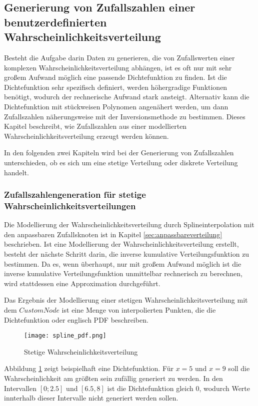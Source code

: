 \subsection{Generierung von Zufallszahlen einer benutzerdefinierten Wahrscheinlichkeitsverteilung}
\label{sec:anpassbareverteilungberechnung}

Besteht die Aufgabe darin Daten zu generieren, die von Zufallswerten einer komplexen Wahrscheinlichkeitsverteilung abhängen, ist es oft nur mit sehr großem Aufwand möglich eine passende Dichtefunktion zu finden. Ist die Dichtefunktion sehr spezifisch definiert, werden höhergradige Funktionen benötigt, wodurch der rechnerische Aufwand stark ansteigt. Alternativ kann die Dichtefunktion mit stückweisen Polynomen angenähert werden, um dann Zufallszahlen näherungsweise mit der Inversionsmethode zu bestimmen. Dieses Kapitel beschreibt, wie Zufallszahlen aus einer modellierten Wahrscheinlichkeitsverteilung erzeugt werden können.

In den folgenden zwei Kapiteln wird bei der Generierung von Zufallszahlen unterschieden, ob es sich um eine stetige Verteilung oder diskrete Verteilung handelt.

\subsubsection{Zufallszahlengeneration für stetige Wahrscheinlichkeitsverteilungen}

Die Modellierung der Wahrscheinlichkeitsverteilung durch Splineinterpolation mit den anpassbaren Zufallsknoten ist in Kapitel \ref{sec:anpassbareverteilung} beschrieben. Ist eine Modellierung der Wahrscheinlichkeitsverteilung erstellt, besteht der nächste Schritt darin, die inverse kumulative Verteilungsfunktion zu bestimmen. Da es, wenn überhaupt, nur mit großem Aufwand möglich ist die inverse kumulative Verteilungsfunktion unmittelbar rechnerisch zu berechnen, wird stattdessen eine Approximation durchgeführt. 

Das Ergebnis der Modellierung einer stetigen Wahrscheinlichkeitsverteilung mit dem $CustomNode$ ist eine Menge von interpolierten Punkten, die die Dichtefunktion oder englisch \ac{PDF} beschreiben. 

\begin{figure}[H]
    \centering
    \texttt{[image: spline\_pdf.png]}
    \caption{Stetige Wahrscheinlichkeitsverteilung}\label{fig:pdf}
\end{figure}

Abbildung \ref{fig:pdf} zeigt beispielhaft eine Dichtefunktion. Für $x=5$ und $x=9$ soll die Wahrscheinlichkeit am größten sein zufällig generiert zu werden. In den Intervallen $[0;2.5]$ und $[6.5,8]$ ist die Dichtefunktion gleich $0$, wodurch Werte innterhalb dieser Intervalle nicht generiert werden sollen.

